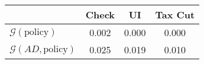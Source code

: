 \begin{tabular}{@{}lccc@{}} 
\toprule 
                          & Check      & UI    & Tax Cut    \\  \midrule 
$\mathcal{G}(\text{policy})$ & 0.002  & 0.000  & 0.000     \\ 
$\mathcal{G}(AD,\text{policy})$ & 0.025  & 0.019  & 0.010     \\ 
\end{tabular}  

